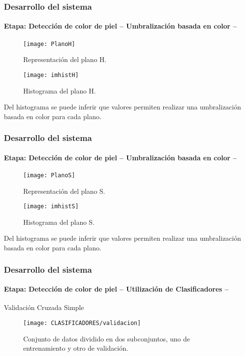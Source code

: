 \documentclass[xcolor=dvipsnames]{beamer}
\begin{document}
	\begin{frame}
		\transdissolve
		\frametitle{Desarrollo del sistema}
		\framesubtitle{Etapa: Detección de color de piel -- Umbralización basada en color -- }
		\begin{center}
			\begin{minipage}[c]{.45\textwidth}
				\begin{figure}[h]
					\texttt{[image: PlanoH]}
					\caption{Representación del plano H.}
				\end{figure}
			\end{minipage}
			\begin{minipage}[c]{.45\textwidth}
				\begin{figure}[h]
					\texttt{[image: imhistH]}
					\caption{Histograma del plano H.}
				\end{figure}
			\end{minipage}
		\end{center}
		{\small{Del histograma se puede inferir que valores permiten realizar una umbralización basada en color para cada plano.}}
	\end{frame}

	\begin{frame}
		\transdissolve
		\frametitle{Desarrollo del sistema}
		\framesubtitle{Etapa: Detección de color de piel -- Umbralización basada en color -- }
		\begin{center}
			\begin{minipage}[c]{.45\textwidth}
				\begin{figure}[h]
					\texttt{[image: PlanoS]}
					\caption{Representación del plano S.}
				\end{figure}
			\end{minipage}
			\begin{minipage}[c]{.45\textwidth}
				\begin{figure}[h]
					\texttt{[image: imhistS]}
					\caption{Histograma del plano S.}
				\end{figure}
			\end{minipage}
		\end{center}
		{\small{Del histograma se puede inferir que valores permiten realizar una umbralización basada en color para cada plano.}}
	\end{frame}
	
	\begin{frame}
		\transdissolve
		\frametitle{Desarrollo del sistema}
		\framesubtitle{Etapa: Detección de color de piel -- Utilización de Clasificadores -- }
		Validación Cruzada Simple
		\begin{figure}[h]
			\centering
			\texttt{[image: CLASIFICADORES/validacion]}
			\caption{Conjunto de datos dividido en dos subconjuntos, uno de entrenamiento y otro de validación.}
		\end{figure}
	\end{frame}
\end{document}

